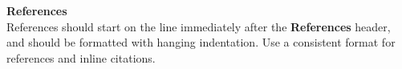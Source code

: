 \documentclass[a4paper,12pt]{article}
\begin{document}
\setlength{\leftmargin}{1.5em}%
\setlength{\itemindent}{-1.5em}%
\setlength{\parsep}{0pt}%
\setlength{\itemsep}{0.2em}%

\noindent\textbf{References}\\
References should start on the line immediately after the {\bf  References} header, and should be
formatted with hanging indentation. Use a consistent format for references and inline citations.

\end{document}
